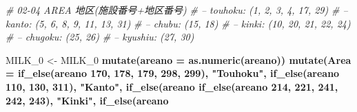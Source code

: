 \documentclass[
]{article}
\newenvironment{Shaded}{\begin{snugshade}}{\end{snugshade}}
\newcommand{\CommentTok}[1]{\textcolor[rgb]{0.56,0.35,0.01}{\textit{#1}}}
\newcommand{\DataTypeTok}[1]{\textcolor[rgb]{0.13,0.29,0.53}{#1}}
\newcommand{\DecValTok}[1]{\textcolor[rgb]{0.00,0.00,0.81}{#1}}
\newcommand{\KeywordTok}[1]{\textcolor[rgb]{0.13,0.29,0.53}{\textbf{#1}}}
\newcommand{\NormalTok}[1]{#1}
\newcommand{\OperatorTok}[1]{\textcolor[rgb]{0.81,0.36,0.00}{\textbf{#1}}}
\newcommand{\StringTok}[1]{\textcolor[rgb]{0.31,0.60,0.02}{#1}}
\begin{document}
\begin{Shaded}
\begin{Highlighting}[]
\CommentTok{# 02-04 AREA 地区(施設番号+地区番号)}
\CommentTok{# – touhoku: (1, 2, 3, 4, 17, 29)}
\CommentTok{# – kanto: (5, 6, 8, 9, 11, 13, 31)}
\CommentTok{# – chubu: (15, 18)}
\CommentTok{# – kinki: (10, 20, 21, 22, 24)}
\CommentTok{# – chugoku: (25, 26)}
\CommentTok{# – kyushiu: (27, 30)}

\NormalTok{MILK_}\DecValTok{0}\NormalTok{ <-}\StringTok{ }\NormalTok{MILK_}\DecValTok{0} \OperatorTok{%
\StringTok{  }\KeywordTok{mutate}\NormalTok{(}\DataTypeTok{areano =} \KeywordTok{as.numeric}\NormalTok{(areano)) }\OperatorTok{%
\StringTok{  }\KeywordTok{mutate}\NormalTok{(}\DataTypeTok{Area =} \KeywordTok{if_else}\NormalTok{(areano }\OperatorTok{%
                                      \DecValTok{170}\NormalTok{, }\DecValTok{178}\NormalTok{, }\DecValTok{179}\NormalTok{, }\DecValTok{298}\NormalTok{, }\DecValTok{299}\NormalTok{), }\StringTok{"Touhoku"}\NormalTok{, }
                  \KeywordTok{if_else}\NormalTok{(areano }\OperatorTok{%
                                          \DecValTok{110}\NormalTok{, }\DecValTok{130}\NormalTok{, }\DecValTok{311}\NormalTok{), }\StringTok{"Kanto"}\NormalTok{, }
                    \KeywordTok{if_else}\NormalTok{(areano }\OperatorTok{%
                      \KeywordTok{if_else}\NormalTok{(areano }\OperatorTok{%
                                \DecValTok{214}\NormalTok{, }\DecValTok{221}\NormalTok{, }\DecValTok{241}\NormalTok{, }\DecValTok{242}\NormalTok{, }\DecValTok{243}\NormalTok{), }\StringTok{"Kinki"}\NormalTok{, }
                        \KeywordTok{if_else}\NormalTok{(areano }\OperatorTok{%
}}}}}}}
\end{Highlighting}
\end{Shaded}
\end{document}
